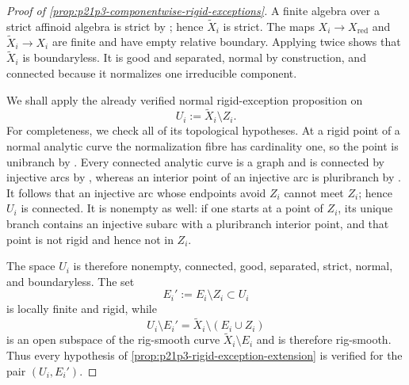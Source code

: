 \begin{proof}[Proof of
\cref{prop:p21p3-componentwise-rigid-exceptions}]
A finite algebra over a strict affinoid algebra is strict by
\cite[Theorem~4.4]{Tate71Rigid}; hence $\widetilde X_i$ is strict.  The maps
$X_i\to X_{\mathrm{red}}$ and
$\widetilde X_i\to X_i$ are finite and have empty relative boundary.
Applying \cite[(11.4.1.3)]{CLD25} twice shows that
$\widetilde X_i$ is boundaryless.  It is good and separated, normal by
construction, and connected because it normalizes one irreducible
component.

We shall apply the already verified normal rigid-exception proposition on
\begin{equation}
 \label{eq:p21p3-componentwise-normal-open}
                         U_i:=\widetilde X_i\setminus Z_i.
\end{equation}
For completeness, we check all of its topological hypotheses.  At a rigid
point of a normal analytic curve the normalization fibre has cardinality
one, so the point is unibranch by
\cite[Proposition~3.5.2]{Ducros24CurveStructure}.  Every connected analytic
curve is a graph and is connected by injective arcs by
\cite[Theorem~3.5.1 and \S1.3.5]{Ducros24CurveStructure}, whereas an
interior point of an injective arc is pluribranch by
\cite[\S1.3.12]{Ducros24CurveStructure}.  It follows that an injective arc
whose endpoints avoid $Z_i$ cannot meet $Z_i$; hence $U_i$ is connected.
It is nonempty as well: if one starts at a point of $Z_i$, its unique branch
contains an injective subarc with a pluribranch interior point, and that
point is not rigid and hence not in $Z_i$.

The space $U_i$ is therefore nonempty, connected, good, separated, strict,
normal, and boundaryless.  The set
\[
                         E_i':=E_i\setminus Z_i\subset U_i
\]
is locally finite and rigid, while
\[
 U_i\setminus E_i'
   =\widetilde X_i\setminus(E_i\cup Z_i)
\]
is an open subspace of the rig-smooth curve
$\widetilde X_i\setminus E_i$ and is therefore rig-smooth.  Thus every
hypothesis of \cref{prop:p21p3-rigid-exception-extension} is verified for
the pair $(U_i,E_i')$.


\end{proof}
